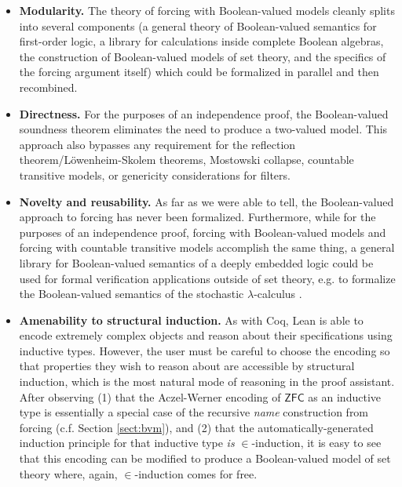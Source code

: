 \documentclass[a4paper,USenglish,cleveref, autoref]{lipics-v2019}
\theoremstyle{definition}
\begin{document}
\begin{itemize}
\item \textbf{Modularity.} The theory of forcing with Boolean-valued models cleanly splits into several components (a general theory of Boolean-valued semantics for first-order logic, a library for calculations inside complete Boolean algebras, the construction of Boolean-valued models of set theory, and the specifics of the forcing argument itself) which could be formalized in parallel and then recombined.

\item \textbf{Directness.} For the purposes of an independence proof, the Boolean-valued soundness theorem eliminates the need to produce a two-valued model. This approach also bypasses any requirement for the reflection theorem/L\"owenheim-Skolem theorems, Mostowski collapse, countable transitive models, or genericity considerations for filters.

\item \textbf{Novelty and reusability.} As far as we were able to tell, the Boolean-valued approach to forcing has never been formalized. Furthermore, while for the purposes of an independence proof, forcing with Boolean-valued models and forcing with countable transitive models accomplish the same thing, a general library for Boolean-valued semantics of a deeply embedded logic could be used for formal verification applications outside of set theory, e.g. to formalize the Boolean-valued semantics of the stochastic $\lambda$-calculus \cite{scott2}.

  \item \textbf{Amenability to structural induction.} As with Coq, Lean is able to encode extremely complex objects and reason about their specifications using inductive types. However, the user must be careful to choose the encoding so that properties they wish to reason about are accessible by structural induction, which is the most natural mode of reasoning in the proof assistant. After observing (1) that the Aczel-Werner encoding of $\mathsf{ZFC}$ as an inductive type is essentially a special case of the recursive \emph{name} construction from forcing (c.f. Section \ref{sect:bvm}), and (2) that the automatically-generated induction principle for that inductive type \emph{is} $\in$-induction, it is easy to see that this encoding can be modified to produce a Boolean-valued model of set theory where, again, $\in$-induction comes for free.
\end{itemize}
\end{document}
